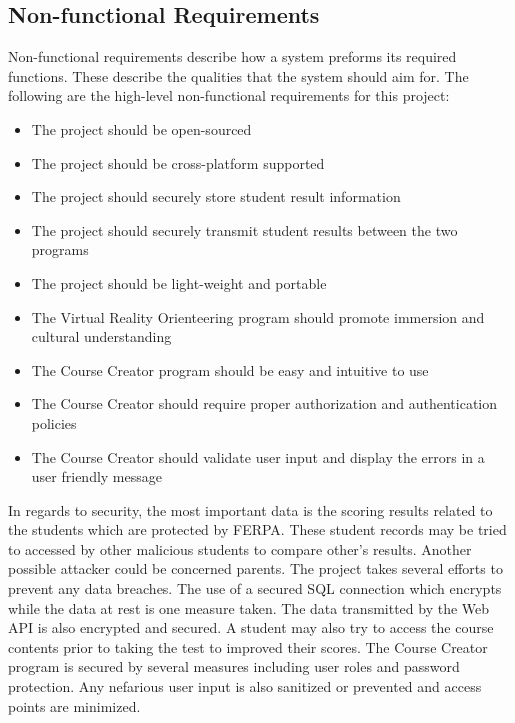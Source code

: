 \subsection{Non-functional Requirements}
Non-functional requirements describe how a system preforms its required functions. These describe the qualities that the system should aim for. The following are the high-level non-functional requirements for this project:
\begin{itemize}
	\item The project should be open-sourced
	\item The project should be cross-platform supported
	\item The project should securely store student result information
	\item The project should securely transmit student results between the two programs
	\item The project should be light-weight and portable
	\item The Virtual Reality Orienteering program should promote immersion and cultural understanding
	\item The Course Creator program should be easy and intuitive to use
	\item The Course Creator should require proper authorization and authentication policies
	\item The Course Creator should validate user input and display the errors in a user friendly message
\end{itemize}

In regards to security, the most important data is the scoring results related to the students which are protected by FERPA. These student records may be tried to accessed by other malicious students to compare other's results. Another possible attacker could be concerned parents. The project takes several efforts to prevent any data breaches. The use of a secured SQL connection which encrypts while the data at rest is one measure taken. The data transmitted by the Web API is also encrypted and secured. A student may also try to access the course contents prior to taking the test to improved their scores. The Course Creator program is secured by several measures including user roles and password protection. Any nefarious user input is also sanitized or prevented and access points are minimized.

